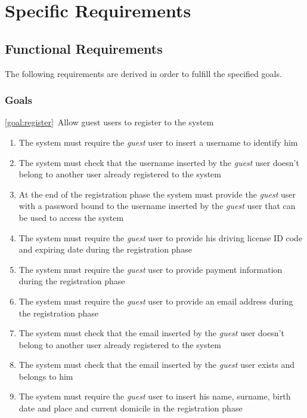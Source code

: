 \section{Specific Requirements}

\subsection{Functional Requirements}
The following requirements are derived in order to fulfill the specified goals.
\subsubsection{Goals}
	\begin{description}
		\item \ref{goal:register}\ Allow guest users to register to the system
			\begin{enumerate}[label=\textbf{R\arabic*}]
  				\item The system must require the \emph{guest} user to insert a username to identify him
   				\item The system must check that the username inserted by the  \emph{guest} user
   				doesn't belong to another user already registered to the system 
   				\item At the end of the registration phase the system must provide the  \emph{guest}
   				user with a password bound to the username inserted by the  \emph{guest} user that can
   				be used to access the system
   				\item The system must require the  \emph{guest} user to provide his driving license ID
   				code and expiring date during the registration phase
   				\item The system must require the  \emph{guest} user to provide payment information
   				during the registration phase
   				\item The system must require the  \emph{guest} user to provide an email address during
   				the	registration phase
   				\item The system must check that the email inserted by the  \emph{guest} user
   				doesn't belong to another user already registered to the system 
   				\item The system must check that the email inserted by the  \emph{guest} user exists
   				and belongs to him
   				\item The system must require the  \emph{guest} user to insert his name, surname,
   				birth date and place and current domicile in the registration phase

\end{enumerate}
\end{description}
